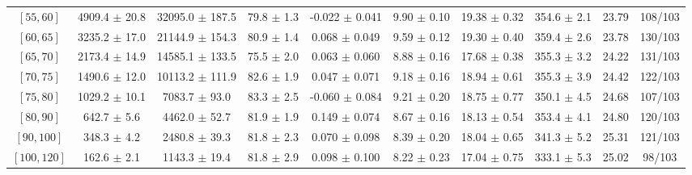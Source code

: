 \begin{tabular}{c||c|c|c|c|c|c|c||c|c}
$[55, 60]$ & 4909.4 $\pm$ 20.8 & 32095.0 $\pm$ 187.5 & 79.8 $\pm$ 1.3 & -0.022 $\pm$ 0.041 & 9.90 $\pm$ 0.10 & 19.38 $\pm$ 0.32 & 354.6 $\pm$ 2.1 & 23.79 & 108/103\\
$[60, 65]$ & 3235.2 $\pm$ 17.0 & 21144.9 $\pm$ 154.3 & 80.9 $\pm$ 1.4 & 0.068 $\pm$ 0.049 & 9.59 $\pm$ 0.12 & 19.30 $\pm$ 0.40 & 359.4 $\pm$ 2.6 & 23.78 & 130/103\\
$[65, 70]$ & 2173.4 $\pm$ 14.9 & 14585.1 $\pm$ 133.5 & 75.5 $\pm$ 2.0 & 0.063 $\pm$ 0.060 & 8.88 $\pm$ 0.16 & 17.68 $\pm$ 0.38 & 355.3 $\pm$ 3.2 & 24.22 & 131/103\\
$[70, 75]$ & 1490.6 $\pm$ 12.0 & 10113.2 $\pm$ 111.9 & 82.6 $\pm$ 1.9 & 0.047 $\pm$ 0.071 & 9.18 $\pm$ 0.16 & 18.94 $\pm$ 0.61 & 355.3 $\pm$ 3.9 & 24.42 & 122/103\\
$[75, 80]$ & 1029.2 $\pm$ 10.1 & 7083.7 $\pm$ 93.0 & 83.3 $\pm$ 2.5 & -0.060 $\pm$ 0.084 & 9.21 $\pm$ 0.20 & 18.75 $\pm$ 0.77 & 350.1 $\pm$ 4.5 & 24.68 & 107/103\\
$[80, 90]$ & 642.7 $\pm$ 5.6 & 4462.0 $\pm$ 52.7 & 81.9 $\pm$ 1.9 & 0.149 $\pm$ 0.074 & 8.67 $\pm$ 0.16 & 18.13 $\pm$ 0.54 & 353.4 $\pm$ 4.1 & 24.80 & 120/103\\
$[90, 100]$ & 348.3 $\pm$ 4.2 & 2480.8 $\pm$ 39.3 & 81.8 $\pm$ 2.3 & 0.070 $\pm$ 0.098 & 8.39 $\pm$ 0.20 & 18.04 $\pm$ 0.65 & 341.3 $\pm$ 5.2 & 25.31 & 121/103\\
$[100, 120]$ & 162.6 $\pm$ 2.1 & 1143.3 $\pm$ 19.4 & 81.8 $\pm$ 2.9 & 0.098 $\pm$ 0.100 & 8.22 $\pm$ 0.23 & 17.04 $\pm$ 0.75 & 333.1 $\pm$ 5.3 & 25.02 & 98/103\\
\end{tabular}
